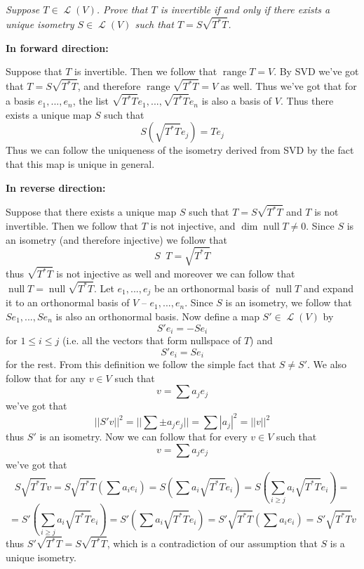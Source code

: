 \documentclass[11pt,oneside,titlepage]{book}
\DeclareMathOperator \map {\mathcal {L}}
\DeclareMathOperator \ns {null}
\DeclareMathOperator \range {range}
\DeclareMathOperator \inv {^{-1}}
\begin{document}
\subsection{}

\textit{Suppose $T \in \map(V)$. Prove that $T$ is invertible if and only if there exists a
  unique isometry $S \in \map(V)$ such that $T = S \sqrt{T^* T}$.}

\textbf{In forward direction: }

Suppose that $T$ is invertible. Then we follow that $\range T = V$. By SVD we've got
that $T = S \sqrt{T^* T}$, and therefore $\range \sqrt{T^* T} = V$ as well. Thus we've
got that for a basis $e_1, ..., e_n$, the list $ \sqrt{T^* T}e_1, ...,  \sqrt{T^* T}e_n$ is also
a basis of $V$.
Thus there exists a unique map $S$ such that 
$$ S (\sqrt{T^* T} e_j) = T e_j$$
Thus we can follow the uniqueness of the isometry derived from SVD by the
fact that this map is unique in general.

\textbf{In reverse direction: }

Suppose that there exists a unique map $S$ such that $T = S \sqrt{T^* T}$ and $T$ is not
invertible. Then we follow that $T$ is not injective, and $\dim \ns T \neq 0$. Since $S$
is an isometry (and therefore injective) we follow that
$$S \inv T = \sqrt{T^* T}$$
thus $\sqrt{T^* T}$ is not injective as well and moreover we can follow that
$\ns T = \ns \sqrt{T^* T}$. 
Let $e_1, ..., e_j$
be an orthonormal basis of $\ns T$ and expand it to an orthonormal basis of $V$ -- $e_1, ..., e_n$.
Since $S$ is an isometry, we follow that $S e_1, ..., S e_n$ is also an orthonormal basis.
Now define a map  $S' \in \map(V)$  by 
$$S' e_i = - Se_i$$
for $1 \leq i \leq j$ (i.e. all the vectors that form nullspace of $T$) and
$$S' e_i = Se_i$$
for the rest. From this definition we follow the simple fact that $S \neq S'$. We also
follow that for any $v \in V$ such that
$$v = \sum a_j e_j$$
we've got that
$$||S'v||^2 = || \sum \pm a_j e_j|| = \sum |a_j|^2 = ||v||^2$$
thus $S'$ is an isometry. Now we can follow that for every $v \in V$ such that
$$v = \sum a_j e_j$$
we've got that
$$S\sqrt{T^* T} v = S\sqrt{T^* T} (\sum a_i e_i) = S (\sum a_i \sqrt{T^* T} e_i) =
S (\sum_{i \geq j} {a_i \sqrt{T^* T} e_i}) =  $$
$$ = S' (\sum_{i \geq j} {a_i \sqrt{T^* T} e_i}) =
S' (\sum {a_i \sqrt{T^* T} e_i}) = S'\sqrt{T^* T} (\sum a_i e_i) = S'\sqrt{T^* T} v $$
thus $S'\sqrt{T^* T} = S\sqrt{T^* T}$, which is a contradiction of our assumption that
$S$ is a unique isometry.

\subsection{}
\end{document}
